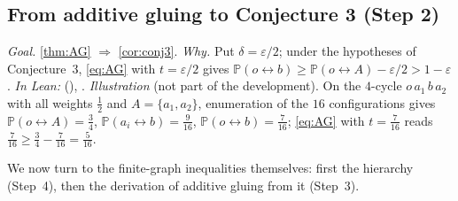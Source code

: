 \documentclass[11pt]{article}
\theoremstyle{definition}
\theoremstyle{remark}
\newcommand{\PP}{\mathbb{P}}
\newcommand{\con}{\leftrightarrow}
\begin{document}
\subsection{From additive gluing to Conjecture 3 (Step 2)}\label{ss:conj3}
\emph{Goal.}  \cref{thm:AG} $\Rightarrow$ \cref{cor:conj3}.  \emph{Why.}  Put $\delta=\varepsilon/2$; under the hypotheses of Conjecture~3,
\eqref{eq:AG} with $t=\varepsilon/2$ gives $\PP(o\con b)\ge\PP(o\con A)-\varepsilon/2>1-\varepsilon$.  \emph{In Lean:} 
(), .
\emph{Illustration} (not part of the development).  On the $4$-cycle $o\,a_1\,b\,a_2$ with all weights $\tfrac12$ and $A=\{a_1,a_2\}$, enumeration of
the $16$ configurations gives $\PP(o\con A)=\tfrac34$, $\PP(a_i\con b)=\tfrac9{16}$, $\PP(o\con b)=\tfrac7{16}$; \eqref{eq:AG} with $t=\tfrac7{16}$ reads
$\tfrac7{16}\ge\tfrac34-\tfrac7{16}=\tfrac5{16}$.

We now turn to the finite-graph inequalities themselves: first the hierarchy (Step~4), then the derivation of additive gluing from it (Step~3).

\end{document}
